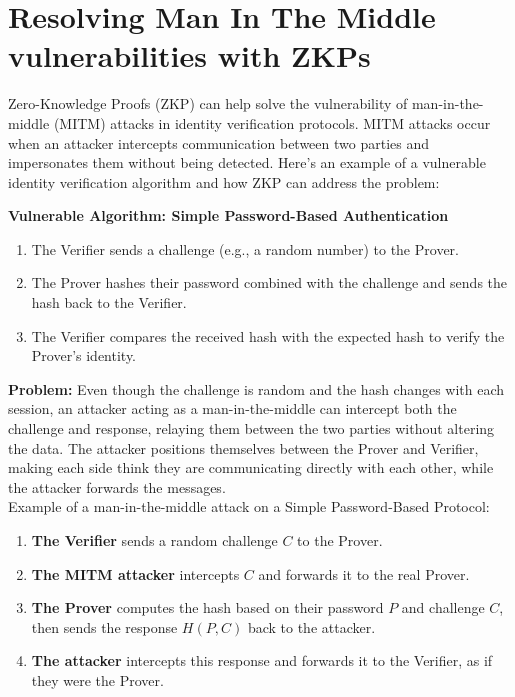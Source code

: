 \section{Resolving Man In The Middle vulnerabilities with ZKPs}
Zero-Knowledge Proofs (ZKP) can help solve the vulnerability of man-in-the-middle (MITM) attacks in identity verification protocols.\cite{distributedlab2024} MITM attacks occur when an attacker intercepts communication between two parties and impersonates them without being detected. Here's an example of a vulnerable identity verification algorithm and how ZKP can address the problem:

\textbf{Vulnerable Algorithm: Simple Password-Based Authentication}
\begin{enumerate}
    \item The Verifier sends a challenge (e.g., a random number) to the Prover.
    \item The Prover hashes their password combined with the challenge and sends the hash back to the Verifier.
    \item The Verifier compares the received hash with the expected hash to verify the Prover's identity.
\end{enumerate}

\textbf{Problem:} Even though the challenge is random and the hash changes with each session, an attacker acting as a man-in-the-middle can intercept both the challenge and response, relaying them between the two parties without altering the data. The attacker positions themselves between the Prover and Verifier, making each side think they are communicating directly with each other, while the attacker forwards the messages.
\\
Example of a man-in-the-middle attack on a Simple Password-Based Protocol:
\begin{enumerate}
    \item \textbf{The Verifier} sends a random challenge \( C \) to the Prover.
    \item \textbf{The MITM attacker} intercepts \( C \) and forwards it to the real Prover.
    \item \textbf{The Prover} computes the hash based on their password \( P \) and challenge \( C \), then sends the response \( H(P, C) \) back to the attacker.
    \item \textbf{The attacker} intercepts this response and forwards it to the Verifier, as if they were the Prover.
\end{enumerate}

